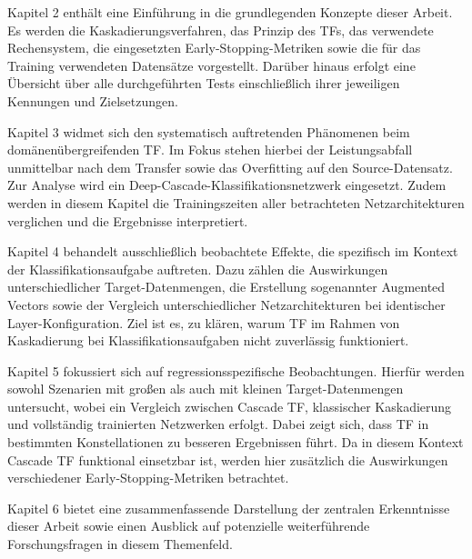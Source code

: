 Kapitel 2 enthält eine Einführung in die grundlegenden Konzepte dieser Arbeit. Es werden die Kaskadierungsverfahren, das Prinzip des 
TFs, das verwendete Rechensystem, die eingesetzten Early-Stopping-Metriken sowie die für das Training verwendeten Datensätze 
vorgestellt. Darüber hinaus erfolgt eine Übersicht über alle durchgeführten Tests einschließlich ihrer jeweiligen Kennungen und Zielsetzungen.

Kapitel 3 widmet sich den systematisch auftretenden Phänomenen beim domänenübergreifenden TF. Im Fokus stehen hierbei der 
Leistungsabfall unmittelbar nach dem Transfer sowie das Overfitting auf den Source-Datensatz. Zur Analyse wird ein 
Deep-Cascade-Klassifikationsnetzwerk eingesetzt. Zudem werden in diesem Kapitel die Trainingszeiten aller betrachteten Netzarchitekturen 
verglichen und die Ergebnisse interpretiert.

Kapitel 4 behandelt ausschließlich beobachtete Effekte, die spezifisch im Kontext der Klassifikationsaufgabe auftreten. Dazu zählen die 
Auswirkungen unterschiedlicher Target-Datenmengen, die Erstellung sogenannter Augmented Vectors sowie der Vergleich 
unterschiedlicher Netzarchitekturen bei identischer Layer-Konfiguration. Ziel ist es, zu klären, warum TF im Rahmen von 
Kaskadierung bei Klassifikationsaufgaben nicht zuverlässig funktioniert.

Kapitel 5 fokussiert sich auf regressionsspezifische Beobachtungen. Hierfür werden sowohl Szenarien mit großen als auch mit kleinen Target-Datenmengen 
untersucht, wobei ein Vergleich zwischen Cascade TF, klassischer Kaskadierung und vollständig trainierten Netzwerken erfolgt. 
Dabei zeigt sich, dass TF in bestimmten Konstellationen zu besseren Ergebnissen führt. Da in diesem Kontext Cascade TF 
funktional einsetzbar ist, werden hier zusätzlich die Auswirkungen verschiedener Early-Stopping-Metriken betrachtet.

Kapitel 6 bietet eine zusammenfassende Darstellung der zentralen Erkenntnisse dieser Arbeit sowie einen Ausblick auf potenzielle weiterführende 
Forschungsfragen in diesem Themenfeld.
